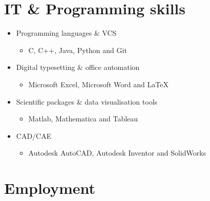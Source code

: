 \documentclass[11pt]{article}
\begin{document}
\section*{IT \& Programming skills} 

\begin{itemize}
	\item Programming languages \& VCS
	\begin{itemize}
		\item C, C++, Java, Python and Git
	\end{itemize}
\end{itemize}

\begin{itemize}
	\item Digital typesetting \& office automation
	\begin{itemize}
		\item Microsoft Excel, Microsoft Word and \LaTeX
	\end{itemize}
\end{itemize}

\begin{itemize}
	\item Scientific packages \& data visualisation tools
	\begin{itemize}
		\item Matlab, Mathematica and Tableau
	\end{itemize}
\end{itemize}

\begin{itemize}
	\item CAD/CAE
	\begin{itemize}
		\item Autodesk AutoCAD, Autodesk Inventor and SolidWorks
	\end{itemize}
\end{itemize}


\section*{Employment}
\end{document}

